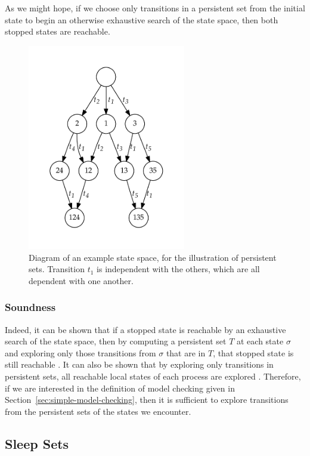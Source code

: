 \documentclass[12pt,a4paper,twoside,openright]{report}
\begin{document}
As we might hope, if we choose only transitions
in a persistent set
from the initial state to begin
an otherwise exhaustive search of the state space, then
both stopped states are reachable.

\begin{figure}
	\centering
	\includegraphics[height=9cm]{persistent1}
	\caption[Diagram of an example state space, for
	the illustration of persistent sets.]
		{Diagram of an example state space, for
		the illustration of persistent sets. Transition
		$t_1$ is independent with the others, which are
		all dependent with one another.}
	\label{fig:persistent}
\end{figure}

\subsubsection{Soundness}
Indeed, it can be shown that if a stopped state is reachable by an exhaustive
search of the state space, then by computing a persistent set $T$ at
each state $\sigma$ and exploring only those transitions from
$\sigma$ that are in $T$, that stopped state is still reachable
\cite[Theorem~4.3]{god96}. It can also be shown
that by exploring only transitions in persistent sets, all reachable
local states of each process are explored
\cite[Theorem~6.14]{god96}. Therefore, if we are interested in
the definition of model checking given in 
Section~\ref{sec:simple-model-checking}, then it is sufficient
to explore transitions from the persistent sets of the states we
encounter.

\subsection{Sleep Sets}
\end{document}
